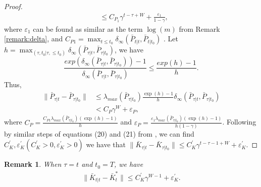 \documentclass[letterpaper, 10 pt, conference]{ieeeconf}  %
\newtheorem{remark}{Remark}
\begin{document}
\begin{proof}
\begin{align*}
        &\leq C_{P_{1}}\gamma^{t-\tau+W}+\frac{\varepsilon_{1}}{1-\gamma},
    \end{align*}
    where $\varepsilon_{1}$ can be found as similar as the term $\log(m)$ from Remark \ref{remark:delta}, and $C_{P1} = \max_{t\leq t_{0}} \delta_{\infty}(\bar{P}_{t|t},\bar{P}_{t|t_{0}})$ . 
Let $h = \max_{(\tau,t_{0}| \tau,\leq t_{0})} \delta_{\infty}(\bar{P}_{\tau|t},\bar{P}_{\tau|t_{0}})$, we have
    \begin{equation*}
        \frac{exp(\delta_{\infty}(\bar{P}_{\tau|t},\bar{P}_{\tau|t_{0}}))-1}{\delta_{\infty}(\bar{P}_{\tau|t},\bar{P}_{\tau|t_{0}})} \leq \frac{exp(h)-1}{h}.
    \end{equation*}
    Thus,
    \begin{align*}
        \|\bar{P}_{\tau|t}-\bar{P}_{\tau|t_{0}}\| &\leq \lambda_{max}(\bar{P}_{\tau|t_{0}})\frac{\exp(h)-1}{h}\delta_{\infty}(\bar{P}_{\tau|t},\bar{P}_{\tau|t_{0}})\\
        &< C_{P}\gamma^{W}+\varepsilon_{P},
    \end{align*}
    where $C_{P} = \frac{C_{P1}\lambda_{max}(\bar{P}_{\tau|t_{0}})(\exp(h)-1)}{h}$ and $\varepsilon_{P} = \frac{\varepsilon_{1}\lambda_{max}(\bar{P}_{\tau|t_{0}})(\exp(h)-1)}{h(1-\gamma)}$. Following by similar steps of equations (20) and (21) from \cite[Lemma 8]{chen_regret_2023}, we can find $C_{K}^{'},\varepsilon_{K}^{'}(C_{K}^{'}>0,\varepsilon_{K}^{'}>0)$ we have that $\|\bar{K}_{\tau|t}-\bar{K}_{\tau|t_{0}}\| \leq C_{K}^{'}\gamma^{t-\tau-1+W}+\varepsilon_{K}^{'}$.
\end{proof}

\begin{remark}
    When $\tau = t$ and $t_{0} = T$, we have
    \begin{align*}
        \|\bar{K}_{t|t}-\bar{K}_{t}^{*}\| \leq C_{K}^{'}\gamma^{W-1} + \varepsilon_{K}^{'}.
    \end{align*}
\end{remark}
\end{document}
